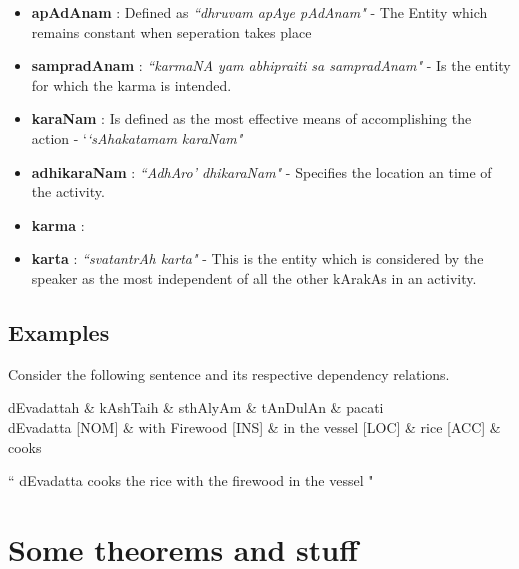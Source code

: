 \documentclass[twoside]{article}
\begin{document}
  \begin{itemize}
    \item \textbf{apAdAnam}  :  Defined as \textit{``dhruvam apAye pAdAnam"} - The Entity which remains constant when seperation takes place
    \item \textbf{sampradAnam}  : \textit{``karmaNA yam abhipraiti sa sampradAnam"} - Is the entity for which the karma is intended. 
    \item \textbf{karaNam} : Is defined as the most effective means of accomplishing the action - `\textit{`sAhakatamam karaNam"}
    \item \textbf{adhikaraNam} : \textit{``AdhAro' dhikaraNam"} - Specifies the location an time of the activity.
    \item \textbf{karma} :  
    \item \textbf{karta} : \textit{``svatantrAh karta"} - This is the entity which is considered by the speaker as the most independent of all the other kArakAs in an activity.
  \end{itemize}

\subsection{Examples}
Consider the following sentence and its respective dependency relations.
\begin{center}
\begin{dependency}[arc edge, arc angle=80, text only label, label style={above}]
   \begin{deptext}[column sep=1em]
      dEvadattah \& kAshTaih \& sthAlyAm \& tAnDulAn \& pacati \\
      dEvadatta [NOM] \& with Firewood [INS] \& in the vessel [LOC] \& rice [ACC]  \& cooks \\
   \end{deptext}
\end{dependency} 

 `` dEvadatta cooks the rice with the firewood in the vessel " \\
\end{center}


\section{Some theorems and stuff} %
\end{document}
